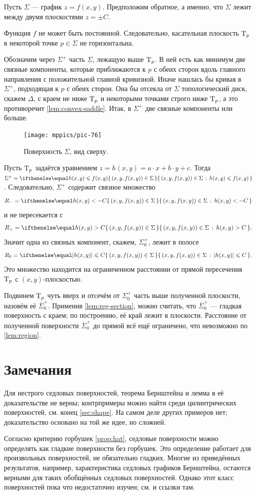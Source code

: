 Пусть $\Sigma$ --- график $z=f(x,y)$.
Предположим обратное, а именно, что $\Sigma$ лежит между двумя плоскостями $z=\pm C$. 

Функция $f$ не может быть постоянной.
Следовательно, касательная плоскость $\mathrm{T}_p$ в некоторой точке $p\in\Sigma$ не горизонтальна.

Обозначим через $\Sigma^+$ часть $\Sigma$, лежащую выше $\mathrm{T}_p$.
В ней есть как минимум две связные компоненты, которые приближаются к $p$ с обеих сторон 
вдоль главного направления с положительной главной кривизной.
Иначе нашлась бы кривая в $\Sigma^+$, подходящая к $p$ с обеих сторон.
Она бы отсекла от $\Sigma$ топологический диск, скажем $\Delta$, с краем не ниже $\mathrm{T}_p$ и некоторыми точками строго ниже $\mathrm{T}_p$,
а это противоречит \ref{lem:convex-saddle}. 
Итак, в $\Sigma^+$ две связные компоненты или больше.

\begin{figure}[!ht]
\vskip-1mm
\centering
\texttt{[image: mppics/pic-76]}
\caption*{Поверхность $\Sigma$, вид сверху.}
\vskip0mm
\end{figure}

Пусть $\mathrm{T}_p$ задаётся уравнением $z=h(x,y)=a\cdot x+b\cdot y+c$.
Тогда $\Sigma^{+} = \set{(x,y,f(x,y))\in \Sigma}{h(x,y) \leq f(x,y)}$.
Следовательно, $\Sigma^{+}$ содержит связное множество
\[R_-=\set{(x,y,f(x,y))\in\Sigma}{h(x,y)< -C}\] 
и не пересекается с  
\[R_+=\set{(x,y,f(x,y))\in\Sigma}{h(x,y)> C} . \]
Значит одна из связных компонент, скажем, $\Sigma^+_0$, лежит в полосе
\[R_0=\set{(x,y,f(x,y))\in\Sigma}{|h(x,y)|\le  C}.\]
Это множество находится на ограниченном расстоянии от прямой пересечения $\mathrm{T}_p$ с $(x,y)$-плоскостью.

Подвинем $\mathrm{T}_p$ чуть вверх и отсечём от $\Sigma^+_0$ часть выше полученной плоскости, назовём её $\bar\Sigma^+_0$.
Применив \ref{lem:reg-section},
можно считать, что $\bar\Sigma^+_0$ --- гладкая поверхность с краем;
по построению, её край лежит в плоскости.
Расстояние от полученной поверхности $\bar\Sigma^+_0$ до прямой всё ещё ограничено,
что невозможно по \ref{lem:region}.
\qeds


\section{Замечания}

Для нестрого седловых поверхностей, теорема Бернштейна и лемма в её доказательстве не верны;
контрпримеры можно найти среди цилинтрических поверхностей, см. конец \ref{sec:shape}.
На самом деле других примеров нет;
доказательство основано на той же идее, но сложней.

Согласно критерию горбушек \ref{prop:hat}, седловые поверхности можно определять как гладкие поверхности без горбушек.
Это определение работает для произвольных поверхностей, не обязательно гладких.
Многие из приведённых результатов, например, характеристика седловых графиков Бернштейна, остаются верными для таких обобщённых седловых поверхностей.
Однако этот класс поверхностей пока что недостаточно изучен; см. \cite[глава 4]{alexander-kapovitch-petrunin2019} и ссылки там.

